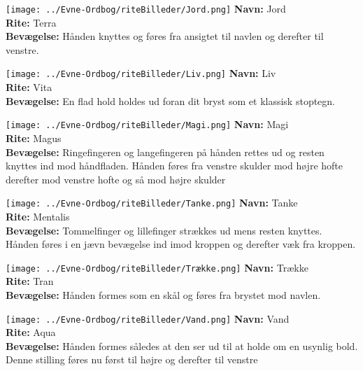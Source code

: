 \begin{rite*}[Jord]
    \centering
    \texttt{[image: ../Evne-Ordbog/riteBilleder/Jord.png]}
\Large \textbf{Navn:} Jord\\
\textbf{Rite:} Terra\\
\textbf{Bevægelse:} Hånden knyttes og føres fra ansigtet til navlen og derefter til venstre.
\end{rite*}

\begin{rite*}[Liv]
    \centering
    \texttt{[image: ../Evne-Ordbog/riteBilleder/Liv.png]}
\Large \textbf{Navn:} Liv\\
\textbf{Rite:} Vita\\
\textbf{Bevægelse:} En flad hold holdes ud foran dit bryst som et klassisk stoptegn.
\end{rite*}

\begin{rite*}[Magi]
    \centering
    \texttt{[image: ../Evne-Ordbog/riteBilleder/Magi.png]}
\Large \textbf{Navn:} Magi\\
\textbf{Rite:} Magus\\
\textbf{Bevægelse:} Ringefingeren og langefingeren på hånden rettes ud og resten knyttes ind mod håndfladen. Hånden føres fra venstre skulder mod højre hofte derefter mod venstre hofte og så mod højre skulder
\end{rite*}

\begin{rite*}[Tanke]
    \centering
    \texttt{[image: ../Evne-Ordbog/riteBilleder/Tanke.png]}
\Large \textbf{Navn:} Tanke\\
\textbf{Rite:} Mentalis\\
\textbf{Bevægelse:} Tommelfinger og lillefinger strækkes ud mens resten knyttes. Hånden føres i en jævn bevægelse ind imod kroppen og derefter væk fra kroppen.
\end{rite*}

\begin{rite*}[Trække]
    \centering
    \texttt{[image: ../Evne-Ordbog/riteBilleder/Trække.png]}
\Large \textbf{Navn:} Trække\\
\textbf{Rite:} Tran\\
\textbf{Bevægelse:} Hånden formes som en skål og føres fra brystet mod navlen.
\end{rite*}

\begin{rite*}[Vand]
    \centering
    \texttt{[image: ../Evne-Ordbog/riteBilleder/Vand.png]}
\Large \textbf{Navn:} Vand\\
\textbf{Rite:} Aqua\\
\textbf{Bevægelse:} Hånden formes således at den ser ud til at holde om en usynlig bold. Denne stilling føres nu først til højre og derefter til venstre
\end{rite*}